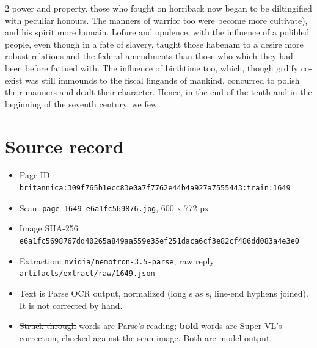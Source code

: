 \documentclass[10pt]{article}
\begin{document}
\begin{multicols}{2}
power and property. those who fought on horriback now began to be diltingified with peculiar honours. The manners of warrior too were become more cultivate), and his spirit more humain. Lofure and opulence, with the influence of a polibled people, even though in a fate of slavery, taught those habenam to a desire more robust relations and the federal amendments than those who which they had been before fattued with. The influence of birthtime too, which, though grdify co-exist was still immounds to the fiscal lingands of mankind, concurred to polish their manners and dealt their character. Hence, in the end of the tenth and in the beginning of the seventh century, we few
\end{multicols}
\section*{Source record}
\begin{itemize}
\item Page ID: \texttt{britannica:309f765b1ecc83e0a7f7762e44b4a927a7555443:train:1649}
\item Scan: \texttt{page-1649-e6a1fc569876.jpg}, 600 x 772 px
\item Image SHA-256: \texttt{\small e6a1fc5698767dd40265a849aa559e35ef251daca6cf3e82cf486dd083a4e3e0}
\item Extraction: \texttt{nvidia/nemotron-3.5-parse}, raw reply \texttt{artifacts/extract/raw/1649.json}
\item Text is Parse OCR output, normalized (long s as s, line-end hyphens joined). It is not corrected by hand.
\item \sout{Struck-through} words are Parse's reading; \textbf{bold} words are Super VL's correction, checked against the scan image. Both are model output.
\end{itemize}
\end{document}
